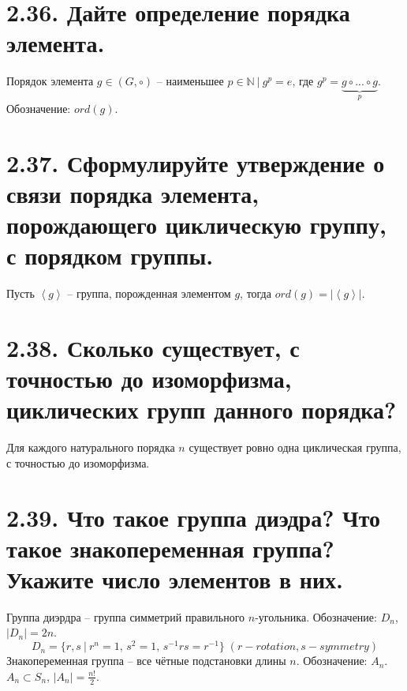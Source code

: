 \documentclass{article}
\begin{document}
\section*{\LARGE 2.36. Дайте определение порядка элемента.  }

Порядок элемента $g \in (G, \circ)$ -- наименьшее $p \in \mathbb{N} \:|\: g^p = e$, где $g^p = \underbrace{g \circ ... \circ g}_{p}$. Обозначение: $ord(g)$.

\section*{\LARGE 2.37. Сформулируйте утверждение о связи порядка элемента, порождающего циклическую группу, с порядком группы.  }

Пусть $\left<g\right>$ -- группа, порожденная элементом $g$, тогда $ord(g) = |\left<g\right>|$.

\section*{\LARGE 2.38. Сколько существует, с точностью до изоморфизма, циклических групп данного порядка? }

Для каждого натурального порядка $n$ существует ровно одна циклическая группа, с точностью до изоморфизма.

\section*{\LARGE 2.39. Что такое группа диэдра? Что такое знакопеременная группа? Укажите число элементов в них. }

Группа диэрдра -- группа симметрий правильного $n$-угольника. Обозначение: $D_n$, $|D_n| = 2n$.
$$ D_n = \{r, s \:|\: r^n = 1,\, s^2 = 1,\, s^{-1}rs = r^{-1}\} \; (r - rotation, s - symmetry)$$
\newline Знакопеременная группа -- все чётные подстановки длины $n$. Обозначение: $A_n$. $A_n \subset S_n$, $|A_n| = \frac{n!}{2}$.

\end{document}
